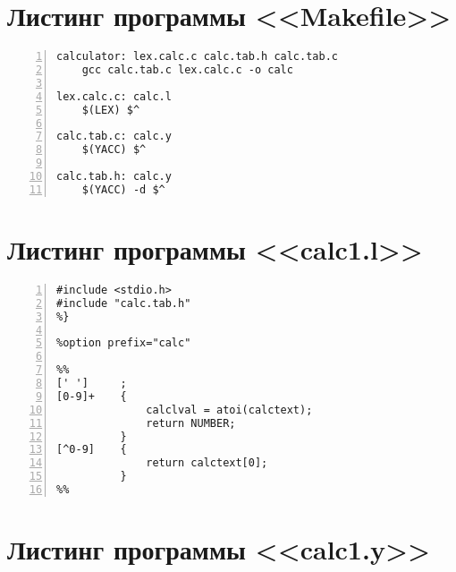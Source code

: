 \documentclass[bachelor, och, coursework, times]{SCWorks}
\begin{document}
%



\appendix

\section{Листинг программы <<Makefile>>}\label{pril-1}

\begin{Verbatim}[fontsize=\small, numbers=left]
calculator: lex.calc.c calc.tab.h calc.tab.c
	gcc calc.tab.c lex.calc.c -o calc

lex.calc.c: calc.l
	$(LEX) $^

calc.tab.c: calc.y
	$(YACC) $^

calc.tab.h: calc.y
	$(YACC) -d $^
\end{Verbatim}

\section{Листинг программы <<calc1.l>>}\label{pril-2}

\begin{Verbatim}[fontsize=\small, numbers=left]
%{
#include <stdio.h>
#include "calc.tab.h"
%}

%option prefix="calc"

%%
[' ']     ;
[0-9]+    {
              calclval = atoi(calctext);
              return NUMBER;
          }
[^0-9]    {             
              return calctext[0]; 
          }
%%
\end{Verbatim}

\section{Листинг программы <<calc1.y>>}\label{pril-3}
\end{document}
